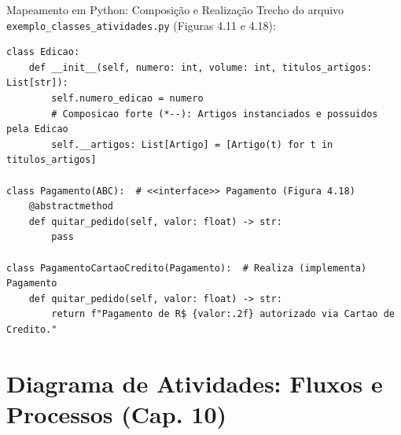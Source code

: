 \documentclass[10pt]{beamer}
\begin{document}
\begin{frame}[fragile]{Mapeamento em Python: Composição e Realização}
    Trecho do arquivo \texttt{exemplo\_classes\_atividades.py} (Figuras 4.11 e 4.18):
\begin{lstlisting}
class Edicao:
    def __init__(self, numero: int, volume: int, titulos_artigos: List[str]):
        self.numero_edicao = numero
        # Composicao forte (*--): Artigos instanciados e possuidos pela Edicao
        self.__artigos: List[Artigo] = [Artigo(t) for t in titulos_artigos]

class Pagamento(ABC):  # <<interface>> Pagamento (Figura 4.18)
    @abstractmethod
    def quitar_pedido(self, valor: float) -> str:
        pass

class PagamentoCartaoCredito(Pagamento):  # Realiza (implementa) Pagamento
    def quitar_pedido(self, valor: float) -> str:
        return f"Pagamento de R$ {valor:.2f} autorizado via Cartao de Credito."
\end{lstlisting}
\end{frame}

\section{Diagrama de Atividades: Fluxos e Processos (Cap. 10)}
\end{document}
